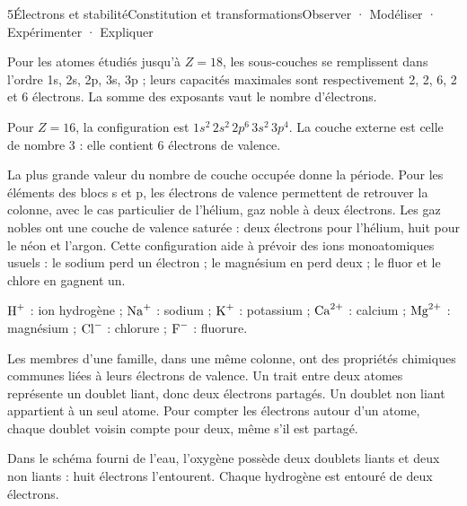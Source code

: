 \begin{ouverture}[lewis]{5}{Électrons et stabilité}{Constitution et transformations}{Observer · Modéliser · Expérimenter · Expliquer}
\end{ouverture}
\essentiel
{}
Pour les atomes étudiés jusqu'à $Z=18$, les sous-couches se remplissent dans l'ordre 1s, 2s, 2p, 3s, 3p ; leurs capacités maximales sont respectivement 2, 2, 6, 2 et 6 électrons. La somme des exposants vaut le nombre d'électrons.
\begin{exemple}[Le soufre]Pour $Z=16$, la configuration est $1s^2\,2s^2\,2p^6\,3s^2\,3p^4$. La couche externe est celle de nombre 3 : elle contient 6 électrons de valence.\end{exemple}
La plus grande valeur du nombre de couche occupée donne la période. Pour les éléments des blocs s et p, les électrons de valence permettent de retrouver la colonne, avec le cas particulier de l'hélium, gaz noble à deux électrons.
Les gaz nobles ont une couche de valence saturée : deux électrons pour l'hélium, huit pour le néon et l'argon. Cette configuration aide à prévoir des ions monoatomiques usuels : le sodium perd un électron ; le magnésium en perd deux ; le fluor et le chlore en gagnent un.
\begin{definition}$\ce{H+}$ : ion hydrogène ; $\ce{Na+}$ : sodium ; $\ce{K+}$ : potassium ; $\ce{Ca^{2+}}$ : calcium ; $\ce{Mg^{2+}}$ : magnésium ; $\ce{Cl-}$ : chlorure ; $\ce{F-}$ : fluorure.\end{definition}
Les membres d'une famille, dans une même colonne, ont des propriétés chimiques communes liées à leurs électrons de valence.
Un trait entre deux atomes représente un doublet liant, donc deux électrons partagés. Un doublet non liant appartient à un seul atome. Pour compter les électrons autour d'un atome, chaque doublet voisin compte pour deux, même s'il est partagé.
\begin{exemple}Dans le schéma fourni de l'eau, l'oxygène possède deux doublets liants et deux non liants : huit électrons l'entourent. Chaque hydrogène est entouré de deux électrons.\end{exemple}
